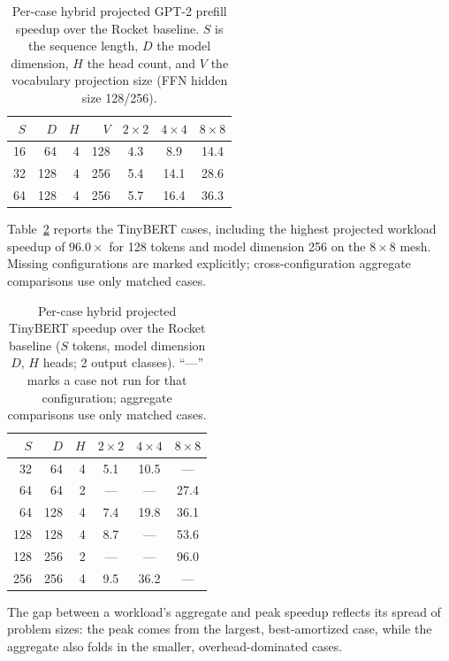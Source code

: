 \documentclass[sigconf,nonacm]{acmart}
\begin{document}
\begin{table}[H]
  \centering
  \caption{Per-case hybrid projected GPT-2 prefill speedup over the Rocket baseline. $S$ is the
    sequence length, $D$ the model dimension, $H$ the head count, and $V$ the
    vocabulary projection size (FFN hidden size 128/256).}
  \label{tab:gpt2}
  \begin{tabular}{rrrrccc}
    \toprule
    $S$ & $D$ & $H$ & $V$ & $2\times2$ & $4\times4$ & $8\times8$ \\
    \midrule
    16 & 64  & 4 & 128 & 4.3 & 8.9  & 14.4 \\
    32 & 128 & 4 & 256 & 5.4 & 14.1 & 28.6 \\
    64 & 128 & 4 & 256 & 5.7 & 16.4 & 36.3 \\
    \bottomrule
  \end{tabular}
\end{table}

Table~\ref{tab:tinybert} reports the TinyBERT cases, including the highest
projected workload speedup of $96.0\times$ for 128 tokens and model dimension
256 on the $8\times8$ mesh. Missing configurations are marked explicitly;
cross-configuration aggregate comparisons use only matched cases.

\begin{table}[H]
  \centering
  \caption{Per-case hybrid projected TinyBERT speedup over the Rocket baseline ($S$ tokens, model
    dimension $D$, $H$ heads; 2 output classes). ``---'' marks a case not run
    for that configuration; aggregate comparisons use only matched cases.}
  \label{tab:tinybert}
  \begin{tabular}{rrrccc}
    \toprule
    $S$ & $D$ & $H$ & $2\times2$ & $4\times4$ & $8\times8$ \\
    \midrule
    32  & 64  & 4 & 5.1 & 10.5 & --- \\
    64  & 64  & 2 & --- & ---  & 27.4 \\
    64  & 128 & 4 & 7.4 & 19.8 & 36.1 \\
    128 & 128 & 4 & 8.7 & ---  & 53.6 \\
    128 & 256 & 2 & --- & ---  & 96.0 \\
    256 & 256 & 4 & 9.5 & 36.2 & --- \\
    \bottomrule
  \end{tabular}
\end{table}

The gap between a workload's aggregate and peak speedup reflects its spread of
problem sizes: the peak comes from the largest, best-amortized case, while the
aggregate also folds in the smaller, overhead-dominated cases.
\end{document}
